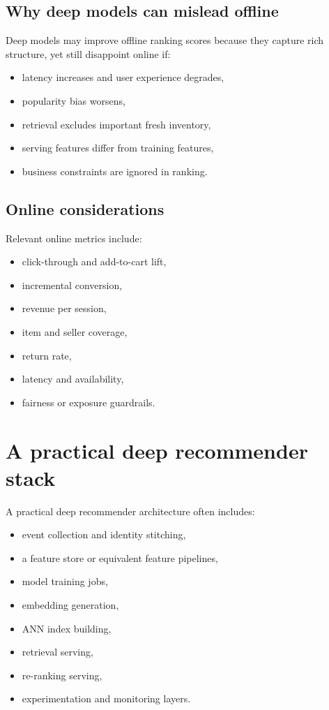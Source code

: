\subsection{Why deep models can mislead offline}
Deep models may improve offline ranking scores because they capture rich structure, yet still disappoint online if:
\begin{itemize}
  \item latency increases and user experience degrades,
  \item popularity bias worsens,
  \item retrieval excludes important fresh inventory,
  \item serving features differ from training features,
  \item business constraints are ignored in ranking.
\end{itemize}

\subsection{Online considerations}
Relevant online metrics include:
\begin{itemize}
  \item click-through and add-to-cart lift,
  \item incremental conversion,
  \item revenue per session,
  \item item and seller coverage,
  \item return rate,
  \item latency and availability,
  \item fairness or exposure guardrails.
\end{itemize}

\section{A practical deep recommender stack}
A practical deep recommender architecture often includes:
\begin{itemize}
  \item event collection and identity stitching,
  \item a feature store or equivalent feature pipelines,
  \item model training jobs,
  \item embedding generation,
  \item ANN index building,
  \item retrieval serving,
  \item re-ranking serving,
  \item experimentation and monitoring layers.
\end{itemize}

